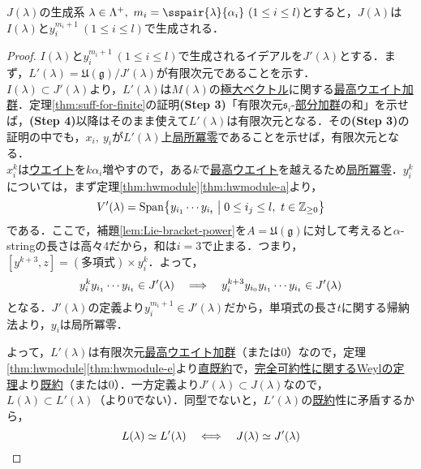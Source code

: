 \documentclass[rep_main]{subfiles}
\begin{document}
\begin{mytheo}[label=thm:generator-of-J]{$J(\lambda)$の生成系}
	$\lambda \in \Lambda^+,\ m_i = \sspair{\lambda}{\alpha_i}\ (1 \leq i \leq l)$とすると，$J(\lambda)$は$I(\lambda)$と$y_i^{m_i + 1}\  (1 \leq i \leq l)$で生成される．
\end{mytheo}
\begin{proof}
	$I(\lambda)$と$y_i^{m_i + 1}\  (1 \leq i \leq l)$で生成されるイデアルを$J'(\lambda)$とする．まず，$L'(\lambda) = \mathfrak{U}(\mathfrak{g}) / J'(\lambda)$が有限次元であることを示す．\\
	$I(\lambda) \subset J'(\lambda)$より，$L'(\lambda)$は$M(\lambda)$の\hyperref[def:maximal-vector-rep]{極大ベクトル}に関する\hyperref[def:highest-weight-module]{最高ウエイト加群}．定理\ref{thm:suff-for-finite}の証明\textbf{(Step 3)}「有限次元$\mathfrak{s}_i$-\hyperref[def:sub-g-module]{部分加群}の和」を示せば，\textbf{(Step 4)}以降はそのまま使えて$L'(\lambda)$は有限次元となる．その\textbf{(Step 3)}の証明の中でも，$x_i,\ y_i$が$L'(\lambda)$上\hyperref[def:locally-nilpotent]{局所冪零}であることを示せば，有限次元となる．\\
	$x_i^k$は\hyperref[def:weight-rep]{ウエイト}を$k\alpha_i$増やすので，ある$k$で\hyperref[def:highest-weight-module]{最高ウエイト}を越えるため\hyperref[def:locally-nilpotent]{局所冪零}．$y_i^k$については，まず定理\ref{thm:hwmodule}\ref{thm:hwmodule-a}より，
	\begin{equation}
		V'(\lambda) = \operatorname{Span}\bigl\{y_{i_1}\cdots y_{i_t} \bigm| 0 \leq i_j \leq l,\ t \in \mathbb{Z}_{\geq 0} \bigr\}
	\end{equation}
	である．ここで，補題\ref{lem:Lie-bracket-power}を$A = \mathfrak{U}(\mathfrak{g})$に対して考えると$\alpha$-stringの長さは高々4だから，和は$i=3$で止まる．つまり，$[y^{k+3}, z] = (\text{多項式})\times y_i^k$．よって，
	\begin{equation}
		y_i^ky_{i_1}\cdots y_{i_t} \in J'(\lambda) \quad \Longrightarrow \quad  y_i^{k+3}y_{i_0}y_{i_1}\cdots y_{i_t} \in J'(\lambda)
	\end{equation}
	となる．$J'(\lambda)$の定義より$y_i^{m_i + 1} \in J'(\lambda)$だから，単項式の長さ$t$に関する帰納法より，$y_i$は局所冪零．
	
	よって，$L'(\lambda)$は有限次元\hyperref[def:highest-weight-module]{最高ウエイト加群}（または$0$）なので，定理\ref{thm:hwmodule}\ref{thm:hwmodule-e}より\hyperref[def:irr]{直既約}で，\hyperref[thm:Weyl]{完全可約性に関するWeylの定理}より\hyperref[def:irr]{既約}（または$0$）．一方定義より$J'(\lambda) \subset J(\lambda)$なので，$L(\lambda) \subset L'(\lambda)$（より$0$でない）．同型でないと，$L'(\lambda)$の\hyperref[def:irr]{既約}性に矛盾するから，
	\begin{equation}
		L(\lambda) \simeq L'(\lambda)  \quad \Longleftrightarrow \quad  J(\lambda) \simeq J'(\lambda)
	\end{equation}
\end{proof}
\end{document}
